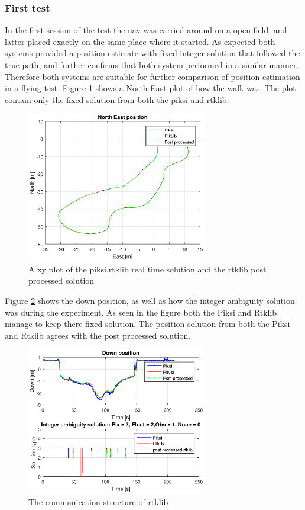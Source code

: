 \subsubsection{First test}
In the first session of the test the \gls{uav} was carried around on a open field, and latter placed exactly on the same place where it started. As expected both systems provided a position estimate with fixed integer solution that followed the true path, and further confirms that both system performed in a similar manner. Therefore both systems are suitable for further comparison of position estimation in a flying test.
Figure \ref{figure:xywalk1} shows a North East plot of how the walk was. The plot contain only the fixed solution from both the piksi and rtklib. 
\begin{figure}[H]
	\centering
		\includegraphics[width=0.7\textwidth]{figs/plots/xywalk1.eps}
		\caption{A xy plot of the piksi,rtklib real time solution and the rtklib post processed solution}
		\label{figure:xywalk1}
\end{figure}
Figure \ref{figure:DownAndAmbwalk1} shows the down position, as well as how the integer ambiguity solution was during the experiment. As seen in the figure both the Piksi and Rtklib manage to keep there fixed solution. The position solution from both the Piksi and Rtklib agrees with the post processed solution. 
\begin{figure}[H]
	\centering
		\includegraphics[width=0.7\textwidth]{figs/plots/downWalk1.eps}
		\caption{The communication structure of rtklib}
		\label{figure:DownAndAmbwalk1}
\end{figure}

